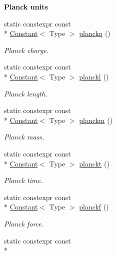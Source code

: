 \begin{Indent}{\bf Planck units}\par
\begin{DoxyCompactItemize}
\item 
static constexpr const \\*
\hyperlink{exceptionmagrathea_1_1Constant}{Constant}$<$ Type $>$ \hyperlink{exceptionmagrathea_1_1Constants_aee0385d62e6f9d4723f6997aedd46fad}{planckq} ()
\begin{DoxyCompactList}\small\item\em Planck charge. \end{DoxyCompactList}\item 
static constexpr const \\*
\hyperlink{exceptionmagrathea_1_1Constant}{Constant}$<$ Type $>$ \hyperlink{exceptionmagrathea_1_1Constants_ac3782534aa2b649e49465f6a0ede0bbb}{planckl} ()
\begin{DoxyCompactList}\small\item\em Planck length. \end{DoxyCompactList}\item 
static constexpr const \\*
\hyperlink{exceptionmagrathea_1_1Constant}{Constant}$<$ Type $>$ \hyperlink{exceptionmagrathea_1_1Constants_af07f55e8d68be5a8906e3b8bb36dd98e}{planckm} ()
\begin{DoxyCompactList}\small\item\em Planck mass. \end{DoxyCompactList}\item 
static constexpr const \\*
\hyperlink{exceptionmagrathea_1_1Constant}{Constant}$<$ Type $>$ \hyperlink{exceptionmagrathea_1_1Constants_ae21b509be2294ef352f9d6840906bd87}{planckt} ()
\begin{DoxyCompactList}\small\item\em Planck time. \end{DoxyCompactList}\item 
static constexpr const \\*
\hyperlink{exceptionmagrathea_1_1Constant}{Constant}$<$ Type $>$ \hyperlink{exceptionmagrathea_1_1Constants_a4658cc006465d13e318ed2b89d48819c}{planckf} ()
\begin{DoxyCompactList}\small\item\em Planck force. \end{DoxyCompactList}\item 
static constexpr const \\*

\end{DoxyCompactItemize}
\end{Indent}

